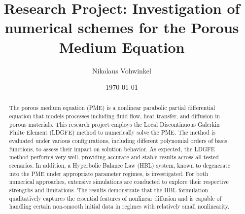 \documentclass[a4paper,12pt]{paper}
\title{Research Project: Investigation of numerical schemes for the Porous Medium Equation}
\author{Nikolaus Vohwinkel}
\date{\today}
\begin{document}
	\maketitle
\begin{abstract}
	The porous medium equation (PME) is a nonlinear parabolic partial differential equation that models processes including fluid flow, heat transfer, and diffusion in porous materials. This research project employs the Local Discontinuous Galerkin Finite Element (LDGFE) method to numerically solve the PME. The method is evaluated under various configurations, including different polynomial orders of basis functions, to assess their impact on solution behavior. As expected, the LDGFE method performs very well, providing accurate and stable results across all tested scenarios. In addition, a Hyperbolic Balance Law (HBL) system, known to degenerate into the PME under appropriate parameter regimes, is investigated. For both numerical approaches, extensive simulations are conducted to explore their respective strengths and limitations. The results demonstrate that the HBL formulation qualitatively captures the essential features of nonlinear diffusion and is capable of handling certain non-smooth initial data in regimes with relatively small nonlinearity.
\end{abstract}
\end{document}
